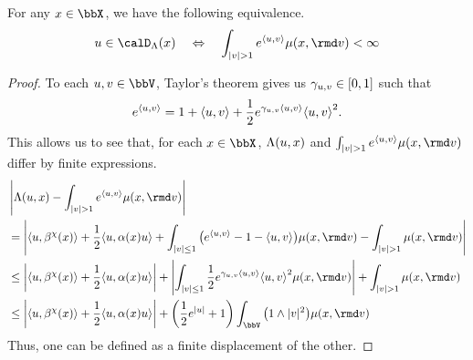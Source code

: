 \begin{lemma}
  \label{lemma:odeSpace-rationale}
  For any $\stateVar \in \stateSpace$, we have the following equivalence.
  \begin{equation*}
    \momentVar \in \odeSpace(\stateVar)
    \quad\Leftrightarrow\quad
    \int_{|\vecVar|>1} e^\prj{\momentVar}{\vecVar} \affJump(\stateVar, \rmd\markVar) < \infty
  \end{equation*}
\end{lemma}
\begin{proof}
  \label{proof:lemma:odeSpace-rationale}
  To each $\momentVar, \vecVar \in \vecSpace$, Taylor's theorem gives us $\gamma_{u,v} \in [0,1]$ such that
  \begin{equation*}
    e^{\langle u , v \rangle} = 1 + {\langle u , v \rangle} + \frac12 e^{\gamma_{u,v} {\langle u , v \rangle}} {\langle u , v \rangle}^2.
  \end{equation*}
  This allows us to see that, for each $\stateVar \in \stateSpace$, $\Lambda(u,x)$ and $\int_{|\markVar|>1} e^\prj{\momentVar}{\markVar} \affJump(\stateVar,\rmd\markVar)$ differ by finite expressions.
  \begin{align*}
    &\left|\ode(\momentVar, \stateVar) - \int_{|\markVar|>1} e^\prj{\momentVar}{\vecVar} \affJump(\stateVar, \rmd\markVar) \right| \tag*{} \\
    &= \left|\prj{\momentVar}{\affDrift^\trunc(\stateVar)} + \frac12\prj{\momentVar}{\affDiff(\stateVar)\momentVar} + \int_{|\vecVar|\leq 1} \big( e^\prj{\momentVar}{\vecVar} - 1 - \prj{\momentVar}{\vecVar} \big) \affJump(\stateVar,\rmd\markVar) - \int_{|\vecVar|>1} \affJump(\stateVar,\rmd\markVar) \right| \\
    &\leq \left|\prj{\momentVar}{\affDrift^\trunc(\stateVar)} + \frac12\prj{\momentVar}{\affDiff(\stateVar)\momentVar} \right| + \left| \int_{|\markVar|\leq1} \frac12 e^{\gamma_{\momentVar,\markVar}\prj{\momentVar}{\markVar}} \prj{\momentVar}{\markVar}^2 \affJump(\stateVar,\rmd\markVar)\right| + \int_{|\markVar|>1} \affJump(\stateVar,\rmd\markVar) \\
    &\leq \left|\prj{\momentVar}{\affDrift^\trunc(\stateVar)} + \frac12\prj{\momentVar}{\affDiff(\stateVar)\momentVar} \right| + \left( \frac12 e^{|\momentVar|} + 1 \right) \int_\vecSpace \big(1 \wedge |\markVar|^2\big) \affJump(\stateVar, \rmd\markVar)
  \end{align*}
  Thus, one can be defined as a finite displacement of the other.
\end{proof}
